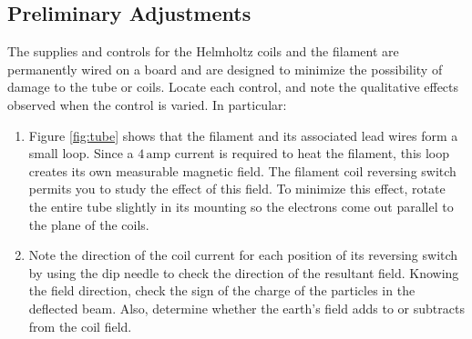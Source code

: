 \subsection{Preliminary Adjustments}
The supplies and controls for the Helmholtz coils and the filament are permanently wired on a board and are designed to minimize the possibility of damage to the tube or coils. Locate each control, and note the qualitative effects observed when the control is varied. In particular:
\begin{enumerate}
\item Figure {\ref{fig:tube}} shows that the filament and its associated lead wires form a small loop. Since a $4\,\mathrm{amp}$ current is required to heat the filament, this loop creates its own measurable magnetic field. The filament coil reversing switch permits you to study the effect of this field. To minimize this effect, rotate the entire tube slightly in its mounting so the electrons come out parallel to the plane of the coils.
\item Note the direction of the coil current for each position of its reversing switch by using the dip needle to check the direction of the resultant field. Knowing the field direction, check the sign of the charge of the particles in the deflected beam. Also, determine whether the earth's field adds to or subtracts from the coil field.
\end{enumerate}

